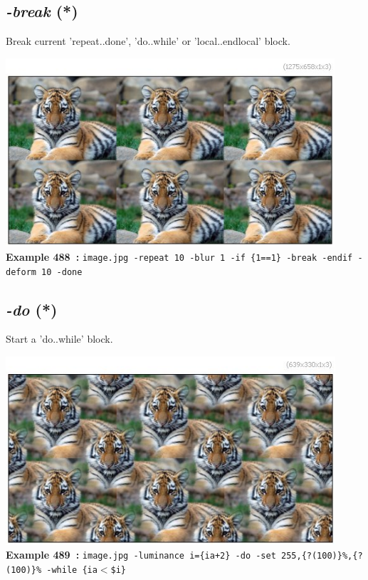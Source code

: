 \documentclass[a4paper,11pt,twoside]{book}
\begin{document}
\subsection{\emph{-break} (*)}\vspace*{-0.5em}
Break current 'repeat..done', 'do..while' or 'local..endlocal' block.
\begin{center}\includegraphics[keepaspectratio=true,height=7cm,width=\textwidth]{img/gmic_def488.jpg}\\
{\footnotesize \textbf{Example 488~:} \texttt{image.jpg -repeat 10 -blur 1 -if \{1==1\} -break -endif -deform 10 -done}}
\end{center}

\subsection{\emph{-do} (*)}\vspace*{-0.5em}
Start a 'do..while' block.
\begin{center}\includegraphics[keepaspectratio=true,height=7cm,width=\textwidth]{img/gmic_def489.jpg}\\
{\footnotesize \textbf{Example 489~:} \texttt{image.jpg -luminance i=\{ia+2\} -do -set 255,\{?(100)\}\%,\{?(100)\}\% -while \{ia$<$\$i\}}}
\end{center}
\end{document}
